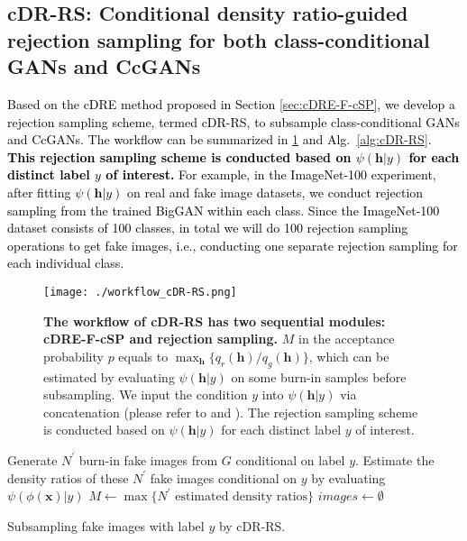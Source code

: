 \documentclass[final,12pt, 3p,times]{elsarticle}
\def\rev#1{\textcolor{black}{#1}}
\begin{document}
\subsection{cDR-RS: Conditional density ratio-guided rejection sampling for both class-conditional GANs and CcGANs}\label{sec:cDR-RS}

\rev{Based on the cDRE method proposed in Section \ref{sec:cDRE-F-cSP}, we develop a rejection sampling scheme, termed cDR-RS, to subsample class-conditional GANs and CcGANs. The workflow can be summarized in \cref{fig:workflow_cDR-RS} and Alg.\ \ref{alg:cDR-RS}. \textbf{This rejection sampling scheme is conducted based on $\psi(\bm{h}|y)$ for each distinct label $y$ of interest.} For example, in the ImageNet-100 \cite{cao2017hashnet} experiment, after fitting $\psi(\bm{h}|y)$ on real and fake image datasets, we conduct rejection sampling from the trained BigGAN within each class. Since the ImageNet-100 dataset consists of 100 classes, in total we will do 100 rejection sampling operations to get fake images, i.e., conducting one separate rejection sampling for each individual class. }







\begin{figure}[h]
	\centering
	\texttt{[image: ./workflow\_cDR-RS.png]}  \caption{\textbf{The workflow of cDR-RS has two sequential modules: cDRE-F-cSP and rejection sampling.} $M$ in the acceptance probability $p$ equals to $\max_{\bm{h}}\{q_r(\bm{h})/q_g(\bm{h})\}$, which can be estimated by evaluating $\psi(\bm{h}|y)$ on some burn-in samples before subsampling. We input the condition $y$ into $\psi(\bm{h}|y)$ via concatenation (please refer to  and ). The rejection sampling scheme is conducted based on $\psi(\bm{h}|y)$ for each distinct label $y$ of interest.}
	\label{fig:workflow_cDR-RS}
\end{figure}

\begin{algorithm}[h]
	\footnotesize
	\SetAlgoLined
	Generate $N^\prime$ burn-in fake images from $G$ conditional on label $y$.\;
	Estimate the density ratios of these $N^\prime$ fake images conditional on $y$ by evaluating $\psi(\phi(\bm{x})|y)$\;
	$M\leftarrow\max\{N^\prime \text{ estimated density ratios}\}$\;
	$images\leftarrow \emptyset$\;
	\caption{Subsampling fake images with label $y$ by cDR-RS.}
	\label{alg:cDR-RS}
\end{algorithm}
\end{document}
